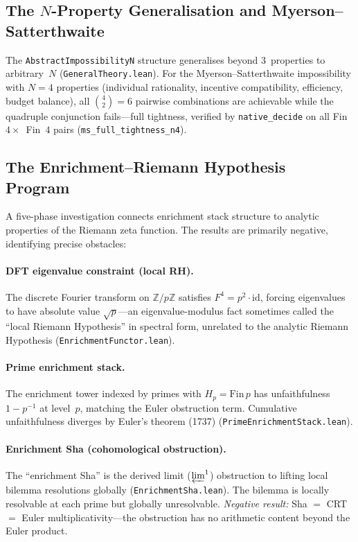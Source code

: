 \documentclass[11pt,a4paper]{article}
\begin{document}
\subsection{The $N$-Property Generalisation and Myerson--Satterthwaite}

The \texttt{AbstractImpossibilityN} structure generalises beyond 3~properties to arbitrary~$N$ (\texttt{GeneralTheory.lean}).  For the Myerson--Satterthwaite impossibility with $N = 4$ properties (individual rationality, incentive compatibility, efficiency, budget balance), all $\binom{4}{2} = 6$ pairwise combinations are achievable while the quadruple conjunction fails---full tightness, verified by \texttt{native\_decide} on all Fin~$4 \times$~Fin~$4$ pairs (\texttt{ms\_full\_tightness\_n4}).

\subsection{The Enrichment--Riemann Hypothesis Program}

A five-phase investigation connects enrichment stack structure to analytic properties of the Riemann zeta function.  The results are primarily negative, identifying precise obstacles:

\paragraph{DFT eigenvalue constraint (local RH).}
The discrete Fourier transform on $\mathbb{Z}/p\mathbb{Z}$ satisfies $F^4 = p^2 \cdot \mathrm{id}$, forcing eigenvalues to have absolute value $\sqrt{p}$---an eigenvalue-modulus fact sometimes called the ``local Riemann Hypothesis'' in spectral form, unrelated to the analytic Riemann Hypothesis (\texttt{EnrichmentFunctor.lean}).

\paragraph{Prime enrichment stack.}
The enrichment tower indexed by primes with $H_p = \mathrm{Fin}\,p$ has unfaithfulness $1 - p^{-1}$ at level~$p$, matching the Euler obstruction term.  Cumulative unfaithfulness diverges by Euler's theorem (1737) (\texttt{PrimeEnrichmentStack.lean}).

\paragraph{Enrichment Sha (cohomological obstruction).}
The ``enrichment Sha'' is the derived limit ($\varprojlim^1$) obstruction to lifting local bilemma resolutions globally (\texttt{EnrichmentSha.lean}).  The bilemma is locally resolvable at each prime but globally unresolvable.  \emph{Negative result:} Sha $=$ CRT $=$ Euler multiplicativity---the obstruction has no arithmetic content beyond the Euler product.
\end{document}
